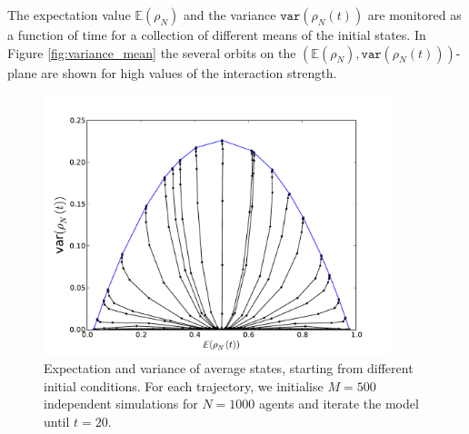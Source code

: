 \documentclass[]{article}
\begin{document}
The expectation value $\mathbb{E}(\rho_N)$ and the variance $\texttt{var}(\rho_N(t))$ are monitored as a function of time for a collection of different means of the initial states. In Figure \ref{fig:variance_mean} the several orbits on the $(\mathbb{E}(\rho_N),\texttt{var}(\rho_N(t)))$-plane are shown for high values of the interaction strength.  


\begin{figure}
\includegraphics[width=0.9\textwidth]{sigma_variance_N1000_M500_fully_connected_20timesteps.pdf}
\caption{Expectation and variance of average states, starting from different initial conditions. For each trajectory, we initialise $M=500$ independent simulations for $N=1000$ agents and iterate the model until $t=20$.}
\label{fig:fig:variance_mean}
\end{figure}



\newpage{}




\end{document}

